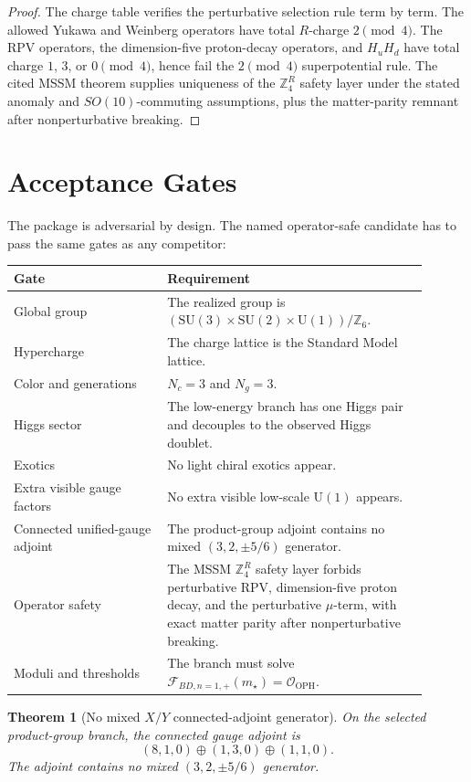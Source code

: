 \documentclass[11pt]{article}
\newtheorem{theorem}{Theorem}[section]
\theoremstyle{remark}
\theoremstyle{plain}
\newcommand{\OPH}{\mathrm{OPH}}
\newcommand{\SU}{\mathrm{SU}}
\newcommand{\U}{\mathrm{U}}
\newcommand{\Z}{\mathbb Z}
\newcommand{\calF}{\mathcal F}
\newcommand{\calO}{\mathcal O}
\newcommand{\ZfourR}{\mathbb Z_4^R}
\begin{document}
\begin{proof}
The charge table verifies the perturbative selection rule term by term. The allowed Yukawa and
Weinberg operators have total \(R\)-charge \(2\pmod4\). The RPV operators, the dimension-five
proton-decay operators, and \(H_uH_d\) have total charge \(1\), \(3\), or \(0\pmod4\), hence fail
the \(2\pmod4\) superpotential rule. The cited MSSM theorem supplies uniqueness of the
\(\ZfourR\) safety layer under the stated anomaly and \(SO(10)\)-commuting assumptions, plus the
matter-parity remnant after nonperturbative breaking.
\end{proof}

\section{Acceptance Gates}

The package is adversarial by design. The named operator-safe candidate has to pass the same
gates as any competitor:
\begin{longtable}{p{0.33\linewidth}p{0.57\linewidth}}
\toprule
\textbf{Gate} & \textbf{Requirement} \\
\midrule
Global group & The realized group is
\((\SU(3)\times\SU(2)\times\U(1))/\Z_6\). \\
Hypercharge & The charge lattice is the Standard Model lattice. \\
Color and generations & \(N_c=3\) and \(N_g=3\). \\
Higgs sector & The low-energy branch has one Higgs pair and decouples to the observed Higgs
doublet. \\
Exotics & No light chiral exotics appear. \\
Extra visible gauge factors & No extra visible low-scale \(\U(1)\) appears. \\
Connected unified-gauge adjoint & The product-group adjoint contains no
mixed \((3,2,\pm5/6)\) generator. \\
Operator safety & The MSSM \(\ZfourR\) safety layer forbids perturbative RPV, dimension-five
proton decay, and the perturbative \(\mu\)-term, with exact matter parity after
nonperturbative breaking. \\
Moduli and thresholds & The branch must solve
\(\calF_{BD,n=1,+}(m_\star)=\calO_{\OPH}\). \\
\bottomrule
\end{longtable}

\begin{theorem}[No mixed \(X/Y\) connected-adjoint generator]
On the selected product-group branch, the connected gauge adjoint is
\[
(8,1,0)\oplus(1,3,0)\oplus(1,1,0).
\]
The adjoint contains no mixed \((3,2,\pm5/6)\) generator.
\end{theorem}
\end{document}
